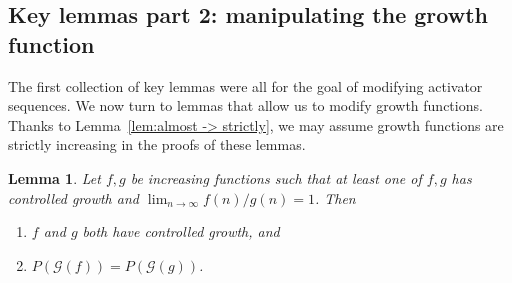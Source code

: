 \documentclass[12pt]{article}
\newtheorem{lemma}[theorem]{Lemma}
\theoremstyle{remark}
\newcommand\cG{\mathcal G}
\begin{document}
\subsection{Key lemmas part 2: manipulating the growth function}\label{sec:aux3}

The first collection of key lemmas were all for the goal of modifying activator sequences. We now turn to lemmas that allow us to modify growth functions. Thanks to Lemma~\ref{lem:almost -> strictly}, we may assume growth functions are strictly increasing in the proofs of these lemmas.

\begin{lemma}\label{lem:f,g same densities}
Let $f,g$ be increasing functions such that at least one of $f,g$ has controlled growth and $\lim_{n \to \infty} f(n)/g(n) = 1$. Then 
\begin{enumerate}
\item[(a)] $f$ and $g$ both have controlled growth, and
\item[(b)] $P(\cG(f)) = P(\cG(g))$. 
\end{enumerate}
\end{lemma}
\end{document}
